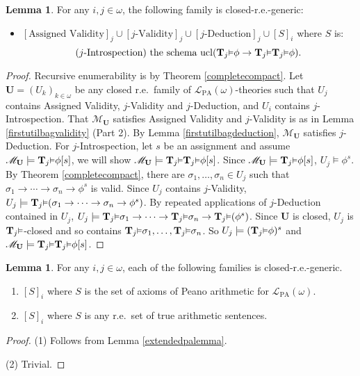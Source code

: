\documentclass[reqno]{article}
\theoremstyle{definition}
\newtheorem{lemma}[theorem]{Lemma}
\def\L{\mathscr{L}}
\def\M{\mathscr{M}}
\def\T{\mathbf{T}}
\def\U{\mathbf{U}}
\def\LPA{\L_{\mathrm{PA}}}
\renewcommand{\Pr}[1]{\T_{#1}\mbox{\small${\vDash}$}}
\newcommand{\ucl}[1]{\mathrm{ucl}(#1)}
\begin{document}
\begin{lemma}
\label{firstutilbagintrospection}
For any $i,j\in\omega$, the following family is closed-r.e.-generic:
\begin{itemize}
\item $[\mbox{Assigned Validity}]_j\cup[\mbox{$j$-Validity}]_j\cup
[\mbox{$j$-Deduction}]_j\cup [S]_i$ where $S$ is:
\[\mbox{($j$-Introspection) the schema $\ucl{\Pr j\phi\rightarrow\Pr j\Pr j\phi}$.}\]
\end{itemize}
\end{lemma}

\begin{proof}
Recursive enumerability is by Theorem \ref{completecompact}.
Let $\U=(U_k)_{k\in\omega}$ be any closed r.e.~family
of $\LPA(\omega)$-theories such that $U_j$ contains Assigned Validity, $j$-Validity and $j$-Deduction,
and $U_i$ contains $j$-Introspection.
That $\M_{\U}$ satisfies Assigned Validity and $j$-Validity is as in
Lemma \ref{firstutilbagvalidity} (Part 2).
By Lemma \ref{firstutilbagdeduction},
$\M_{\U}$ satisfies $j$-Deduction.
For $j$-Introspection, let $s$ be an assignment and assume
$\M_{\U}\models \Pr j\phi[s]$, we will show $\M_{\U}\models\Pr j\Pr j\phi[s]$.
Since $\M_{\U}\models \Pr j\phi[s]$, $U_j\models\phi^s$.
By Theorem \ref{completecompact}, there are $\sigma_1,\ldots,\sigma_n\in U_j$
such that $\sigma_1\rightarrow\cdots\rightarrow\sigma_n\rightarrow\phi^s$
is valid.
Since $U_j$ contains $j$-Validity,
$U_j\models \Pr j(\sigma_1\rightarrow\cdots\rightarrow\sigma_n\rightarrow\phi^s)$.
By repeated applications of $j$-Deduction contained in $U_j$,
$U_j\models \Pr j\sigma_1\rightarrow\cdots\rightarrow\Pr j\sigma_n\rightarrow \Pr j(\phi^s)$.
Since $\U$ is closed, $U_j$ is $\Pr j$-closed and
so contains $\Pr j\sigma_1,\ldots,\Pr j\sigma_n$.
So $U_j\models (\Pr j\phi)^s$ and $\M_{\U}\models \Pr j\Pr j\phi[s]$.
\end{proof}

\begin{lemma}
\label{firstutilbagarithmetic}
For any $i,j\in\omega$, each of the following families is closed-r.e.-generic.
\begin{enumerate}
\item $[S]_i$ where $S$ is the set of axioms of Peano arithmetic for $\LPA(\omega)$.
\item $[S]_i$ where $S$ is any r.e.~set of true arithmetic sentences.
\end{enumerate}
\end{lemma}

\begin{proof}
\item (1) Follows from Lemma \ref{extendedpalemma}.

\item (2) Trivial.
\end{proof}
\end{document}
